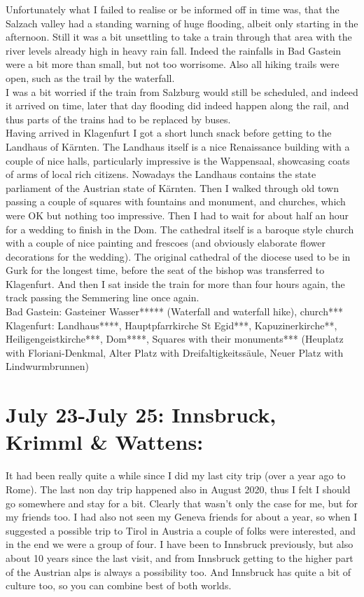 {Unfortunately what I failed to realise or be informed off in time was, that the Salzach valley had a standing warning of huge flooding, albeit only starting in the afternoon. Still it was a bit unsettling to take a train through that area with the river levels already high in heavy rain fall. Indeed the rainfalls in Bad Gastein were a bit more than small, but not too worrisome. Also all hiking trails were open, such as the trail by the waterfall.\\

I was a bit worried if the train from Salzburg would still be scheduled, and indeed it arrived on time, later that day flooding did indeed happen along the rail, and thus parts of the trains had to be replaced by buses.\\
Having arrived in Klagenfurt I got a short lunch snack before getting to the Landhaus of K\"arnten. The Landhaus itself is a nice Renaissance building with a couple of nice halls, particularly impressive is the Wappensaal, showcasing coats of arms of local rich citizens. Nowadays the Landhaus contains the state parliament of the Austrian state of K\"arnten. Then I walked through old town passing a couple of squares with fountains and monument, and churches, which were OK but nothing too impressive. Then I had to wait for about half an hour for a wedding to finish in the Dom. The cathedral itself is a baroque style church with a couple of nice painting and frescoes (and obviously elaborate flower decorations for the wedding). The original cathedral of the diocese used to be in Gurk for the longest time, before the seat of the bishop was transferred to Klagenfurt. And then I sat inside the train for more than four hours again, the track passing the Semmering line once again.\\

Bad Gastein: Gasteiner Wasser***** (Waterfall and waterfall hike), church***\\
Klagenfurt: Landhaus****, Hauptpfarrkirche St Egid***, Kapuzinerkirche**, Heiligengeistkirche***, Dom****, Squares with their monuments*** (Heuplatz with Floriani-Denkmal, Alter Platz with Dreifaltigkeitss\"aule, Neuer Platz with Lindwurmbrunnen)\\

\section{July 23-July 25: Innsbruck, Krimml \& Wattens:}
\label{2021Innsbruck}

It had been really quite a while since I did my last city trip (over a year ago to Rome). The last non day trip happened also in August 2020, thus I felt I should go somewhere and stay for a bit. Clearly that wasn't only the case for me, but for my friends too.
I had also not seen my Geneva friends for about a year, so when I suggested a possible trip to Tirol in Austria a couple of folks were interested, and in the end we were a group of four. I have been to Innsbruck previously, but also about 10 years since the last visit, and from Innsbruck getting to the higher part of the Austrian alps is always a possibility too. And Innsbruck has quite a bit of culture too, so you can combine best of both worlds.

}
